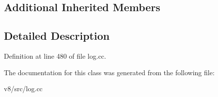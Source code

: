 \subsection*{Additional Inherited Members}


\subsection{Detailed Description}


Definition at line 480 of file log.\+cc.



The documentation for this class was generated from the following file\+:\begin{DoxyCompactItemize}
\item 
v8/src/log.\+cc\end{DoxyCompactItemize}
